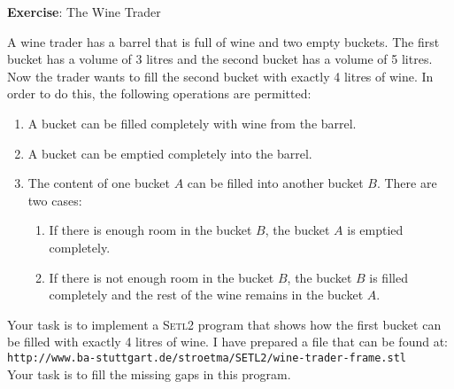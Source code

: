 \documentclass{article}
\begin{document}
\noindent
{\Large \textbf{Exercise}: The Wine Trader}
\vspace{1.0cm}



\noindent
A wine trader has a barrel that is full of wine and two empty buckets.
The first bucket has a volume of 3 litres and the second bucket has a volume of 5 litres.
Now the trader wants to fill the second bucket with exactly 4 litres of wine.  
In order to do this, the following operations are permitted:
\begin{enumerate}
\item A bucket can be filled completely with wine from the barrel.
\item A bucket can be emptied completely into the barrel.
\item The content of one bucket $A$ can be filled into another bucket $B$.
      There are two cases:
      \begin{enumerate}
      \item If there is enough room in the bucket $B$, the 
            bucket $A$ is emptied completely.
      \item If there is not enough room in the bucket $B$,  the  bucket $B$
            is filled completely and the rest of the wine remains in the bucket $A$.
      \end{enumerate}
\end{enumerate}
Your task is to implement a \textsc{Setl2} program that shows how the first bucket can be
filled with exactly 4 litres of wine.  
 I have prepared a file that can be found at:
\\[0.2cm]
\hspace*{1.3cm}
\texttt{http://www.ba-stuttgart.de/stroetma/SETL2/wine-trader-frame.stl} 
\\[0.2cm]
Your task is to fill the missing gaps in this program.
\end{document}
